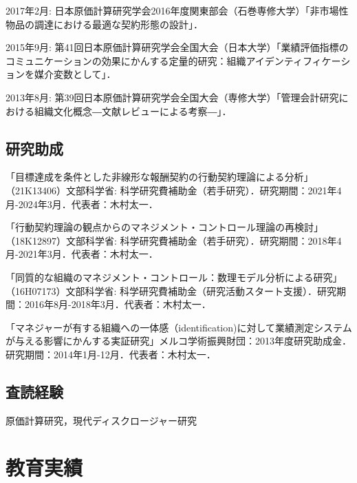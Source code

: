\documentclass[letterpaper,uplatex]{article}
\renewenvironment{itemize}{
  \begin{list}{}{
    \setlength{\leftmargin}{1.5em}
  }
}{
  \end{list}
}
\begin{document}
\begin{itemize}
	\item 2017年2月: 日本原価計算研究学会2016年度関東部会（石巻専修大学）「非市場性物品の調達における最適な契約形態の設計」．

	\item 2015年9月: 第41回日本原価計算研究学会全国大会（日本大学）「業績評価指標のコミュニケーションの効果にかんする定量的研究：組織アイデンティフィケーションを媒介変数として」．

	\item 2013年8月: 第39回日本原価計算研究学会全国大会（専修大学）「管理会計研究における組織文化概念―文献レビューによる考察―」．
\end{itemize}

\subsection*{研究助成}

\begin{itemize}
\item 「目標達成を条件とした非線形な報酬契約の行動契約理論による分析」（21K13406）文部科学省: 科学研究費補助金（若手研究）．研究期間：2021年4月-2024年3月．代表者：木村太一．

\item 「行動契約理論の観点からのマネジメント・コントロール理論の再検討」（18K12897）文部科学省: 科学研究費補助金（若手研究）．研究期間：2018年4月-2021年3月．代表者：木村太一．

\item 「同質的な組織のマネジメント・コントロール：数理モデル分析による研究」（16H07173）文部科学省: 科学研究費補助金（研究活動スタート支援）．研究期間：2016年8月-2018年3月．代表者：木村太一．

\item 「マネジャーが有する組織への一体感（identification)に対して業績測定システムが与える影響にかんする実証研究」メルコ学術振興財団：2013年度研究助成金．研究期間：2014年1月-12月．代表者：木村太一．
\end{itemize}

\subsection*{査読経験}
    \begin{itemize}
        \item 原価計算研究，現代ディスクロージャー研究
    \end{itemize}

\section*{教育実績}
\end{document}
